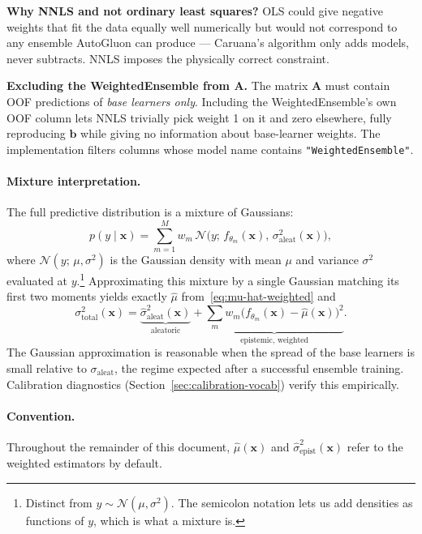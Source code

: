 \documentclass[11pt,a4paper]{article}
\begin{document}
\begin{intuitionbox}
\textbf{Why NNLS and not ordinary least squares?} OLS could give negative weights that fit the data equally well numerically but would not correspond to any ensemble AutoGluon can produce --- Caruana's algorithm only adds models, never subtracts. NNLS imposes the physically correct constraint.
\end{intuitionbox}

\begin{cautionbox}
\textbf{Excluding the WeightedEnsemble from $\mathbf{A}$.} The matrix $\mathbf{A}$ must contain OOF predictions of \emph{base learners only}. Including the WeightedEnsemble's own OOF column lets NNLS trivially pick weight 1 on it and zero elsewhere, fully reproducing $\bm b$ while giving no information about base-learner weights. The implementation filters columns whose model name contains \texttt{"WeightedEnsemble"}.
\end{cautionbox}

\paragraph{Mixture interpretation.} The full predictive distribution is a mixture of Gaussians:
\[
p(y \mid \bm x) = \sum_{m=1}^M w_m \, \mathcal{N}\!\big(y;\, f_{\theta_m}(\bm x),\, \sigma^2_{\text{aleat}}(\bm x)\big),
\]
where $\mathcal{N}(y;\, \mu, \sigma^2)$ is the Gaussian density with mean $\mu$ and variance $\sigma^2$ evaluated at $y$.\footnote{Distinct from $y \sim \mathcal{N}(\mu, \sigma^2)$. The semicolon notation lets us add densities as functions of $y$, which is what a mixture is.} Approximating this mixture by a single Gaussian matching its first two moments yields exactly $\hat\mu$ from~\eqref{eq:mu-hat-weighted} and
\[
\sigma^2_{\text{total}}(\bm x) =
\underbrace{\hat\sigma^2_{\text{aleat}}(\bm x)}_{\text{aleatoric}}
+
\underbrace{\sum_m w_m \big(f_{\theta_m}(\bm x) - \hat\mu(\bm x)\big)^2}_{\text{epistemic, weighted}}.
\]
The Gaussian approximation is reasonable when the spread of the base learners is small relative to $\sigma_{\text{aleat}}$, the regime expected after a successful ensemble training. Calibration diagnostics (Section~\ref{sec:calibration-vocab}) verify this empirically.

\paragraph{Convention.} Throughout the remainder of this document, $\hat\mu(\bm x)$ and $\hat\sigma^2_{\text{epist}}(\bm x)$ refer to the weighted estimators by default.
\end{document}
